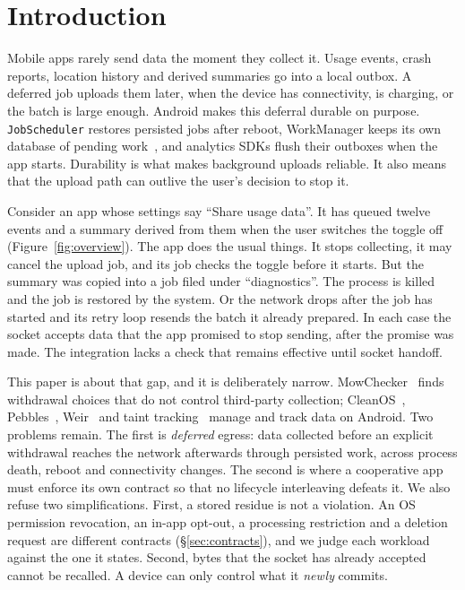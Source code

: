 \section{Introduction}
\label{sec:intro}


Mobile apps rarely send data the moment they collect it. Usage events, crash reports, location history and derived
summaries go into a local outbox. A deferred job uploads them later, when the device has connectivity, is charging, or the
batch is large enough. Android makes this deferral durable on purpose. \texttt{JobScheduler} restores persisted jobs after
reboot, WorkManager keeps its own database of pending work~\cite{android_jobscheduler,android_workmanager}, and analytics SDKs
flush their outboxes when the app starts. Durability is what makes background uploads reliable. It also means that the upload
path can outlive the user's decision to stop it.

Consider an app whose settings say ``Share usage data''. It has queued twelve events and a summary derived from them when the user
switches the toggle off (Figure~\ref{fig:overview}). The app does the usual things. It stops collecting, it may cancel the
upload job, and its job checks the toggle before it starts. But the summary was copied into a job filed under
``diagnostics''. The process is killed and the job is restored by the system. Or the network drops after the job has started
and its retry loop resends the batch it already prepared. In each case the socket accepts data that the app promised to stop
sending, after the promise was made. The integration lacks a check that remains effective until socket handoff.

This paper is about that gap, and it is deliberately narrow. MowChecker~\cite{du2024mowchecker} finds withdrawal choices
that do not control third-party collection; CleanOS~\cite{tang2012cleanos}, Pebbles~\cite{spahn2014pebbles},
Weir~\cite{nadkarni2016weir} and taint tracking~\cite{enck2010taintdroid,arzt2014flowdroid} manage and track data on
Android. Two problems remain. The first is \emph{deferred} egress: data collected before an explicit withdrawal reaches the
network afterwards through persisted work, across process death, reboot and connectivity changes. The second is where a
cooperative app must enforce its own contract so that no lifecycle interleaving defeats it. We also refuse two simplifications.
First, a stored residue is not a violation. An OS permission revocation, an in-app opt-out, a processing restriction and a
deletion request are different contracts (\S\ref{sec:contracts}), and we judge each workload against the one it states.
Second, bytes that the socket has already accepted cannot be recalled. A device can only control what it \emph{newly} commits.

